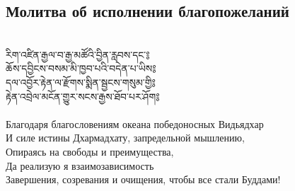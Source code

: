 \subsection{Молитва об исполнении благопожеланий}
\\
\ti
རིག་འཛིན་རྒྱལ་བ་རྒྱ་མཚོའི་བྱིན་རླབས་དང་༔\\
ཆོས་དབྱིངས་བསམ་མི་ཁྱབ་པའི་བདེན་པ་ཡིས༔\\
དལ་འབྱོར་རྟེན་ལ་རྫོགས་སྨིན་སྦྱངས་གསུམ་གྱི༔\\
རྟེན་འབྲེལ་མངོན་གྱུར་སངས་རྒྱས་ཐོབ་པར་ཤོག༔\\
\\
\ru
Благодаря благословениям океана победоносных Видьядхар\\
И силе истины Дхармадхату, запредельной мышлению,\\
Опираясь на свободы и преимущества,\\
Да реализую я взаимозависимость\\
Завершения, созревания и очищения, чтобы все стали Буддами!\\
